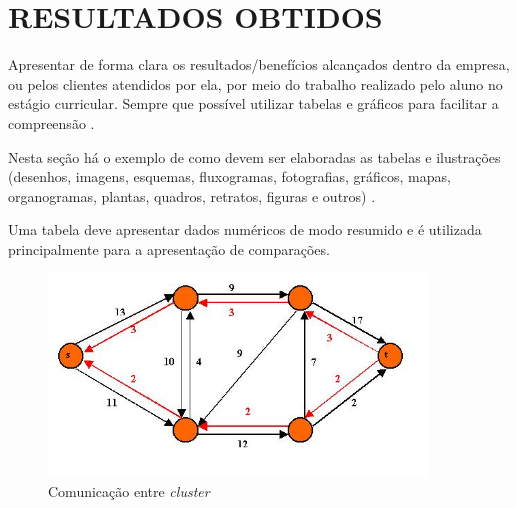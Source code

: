 
\chapter{RESULTADOS OBTIDOS}
\label{resultados-obtidos}

Apresentar de forma clara os resultados/benefícios alcançados dentro da empresa, ou pelos clientes atendidos por ela, por meio do trabalho realizado pelo aluno no estágio curricular. Sempre que possível utilizar tabelas e gráficos para facilitar a compreensão \cite{marquesone2016big}.

	Nesta seção há o exemplo de como devem ser elaboradas as tabelas e ilustrações (desenhos, imagens, esquemas, fluxogramas, fotografias, gráficos, mapas, organogramas, plantas, quadros, retratos, figuras e outros) \cite{Apache2018}.
    
	Uma tabela deve apresentar dados numéricos de modo resumido e é utilizada principalmente para a apresentação de comparações.

\begin{figure}[!htb]
	\centering
	\includegraphics[width=0.9\textwidth]{./figuras/figura1.jpg}
	\caption{Comunicação entre \textit{cluster}}
	\label{fig:figura1}
\end{figure}